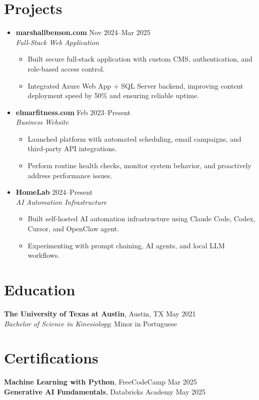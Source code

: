 \documentclass[letterpaper,10pt]{article}
\newcommand{\resumeItem}[1]{\item \small{#1}}
\begin{document}
\section*{Projects}
\begin{itemize}
  \item[]
    \textbf{marshallbenson.com} \hfill Nov 2024--Mar 2025 \\
    \textit{Full-Stack Web Application}
  \begin{itemize}
    \resumeItem{Built secure full-stack application with custom CMS, authentication, and role-based access control.}
    \resumeItem{Integrated Azure Web App + SQL Server backend, improving content deployment speed by 50\% and ensuring reliable uptime.}
  \end{itemize}

  \item[]
    \textbf{elmarfitness.com} \hfill Feb 2023--Present \\
    \textit{Business Website}
  \begin{itemize}
    \resumeItem{Launched platform with automated scheduling, email campaigns, and third-party API integrations.}
    \resumeItem{Perform routine health checks, monitor system behavior, and proactively address performance issues.}
  \end{itemize}

  \item[]
    \textbf{HomeLab} \hfill 2024--Present \\
    \textit{AI Automation Infrastructure}
  \begin{itemize}
    \resumeItem{Built self-hosted AI automation infrastructure using Claude Code, Codex, Cursor, and OpenClaw agent.}
    \resumeItem{Experimenting with prompt chaining, AI agents, and local LLM workflows.}
  \end{itemize}
\end{itemize}

\section*{Education}
\textbf{The University of Texas at Austin}, Austin, TX \hfill May 2021 \\
\textit{Bachelor of Science in Kinesiology}; Minor in Portuguese

\section*{Certifications}
\textbf{Machine Learning with Python}, FreeCodeCamp \hfill Mar 2025 \\
\textbf{Generative AI Fundamentals}, Databricks Academy \hfill May 2025
\end{document}
